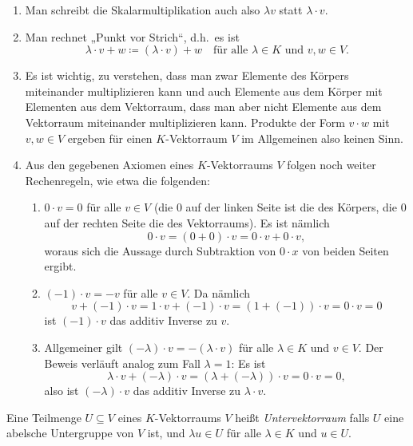 \begin{bem}
 \begin{enumerate}[leftmargin=*]
  \item
   Man schreibt die Skalarmultiplikation auch also $\lambda v$ statt $\lambda \cdot v$.
  \item
   Man rechnet „Punkt vor Strich“, d.h.\ es ist
   \[
    \lambda \cdot v + w \coloneqq (\lambda \cdot v) + w
    \quad\text{für alle $\lambda \in K$ und $v,w \in V$}.
   \]
  \item
   Es ist wichtig, zu verstehen, dass man zwar Elemente des Körpers miteinander multiplizieren kann und auch Elemente aus dem Körper mit Elementen aus dem Vektorraum, dass man aber nicht Elemente aus dem Vektorraum miteinander multiplizieren kann. Produkte der Form $v \cdot w$ mit $v,w \in V$ ergeben für einen $K$-Vektorraum $V$ im Allgemeinen also keinen Sinn.
  \item
   Aus den gegebenen Axiomen eines $K$-Vektorraums $V$ folgen noch weiter Rechenregeln, wie etwa die folgenden:
   \begin{enumerate}[label=\alph*)]
    \item
     $0 \cdot v = 0$ für alle $v \in V$ (die $0$ auf der linken Seite ist die des Körpers, die $0$ auf der rechten Seite die des Vektorraums). Es ist nämlich
     \[
      0 \cdot v = (0+0) \cdot v = 0 \cdot v + 0 \cdot v,
     \]
     woraus sich die Aussage durch Subtraktion von $0 \cdot x$ von beiden Seiten ergibt.
    \item
     $(-1) \cdot v = -v$ für alle $v \in V$. Da nämlich
     \[
      v + (-1) \cdot v = 1 \cdot v + (-1) \cdot v = (1 + (-1)) \cdot v = 0 \cdot v = 0
     \]
     ist $(-1) \cdot v$ das additiv Inverse zu $v$.
    \item
     Allgemeiner gilt $(-\lambda) \cdot v = -(\lambda \cdot v)$ für alle $\lambda \in K$ und $v \in V$. Der Beweis verläuft analog zum Fall $\lambda = 1$: Es ist
     \[
      \lambda \cdot v + (-\lambda) \cdot v
      = (\lambda + (-\lambda)) \cdot v
      = 0 \cdot v
      = 0,
     \]
     also ist $(-\lambda) \cdot v$ das additiv Inverse zu $\lambda \cdot v$.
   \end{enumerate}
 \end{enumerate}
\end{bem}



\begin{defi}
 Eine Teilmenge $U \subseteq V$ eines $K$-Vektorraums $V$ heißt \emph{Untervektorraum} falls $U$ eine abelsche Untergruppe von $V$ ist, und $\lambda u \in U$ für alle $\lambda \in K$ und $u \in U$.
\end{defi}


